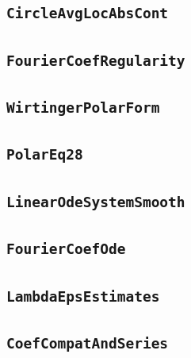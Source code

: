 \documentclass[11pt]{amsart}
\theoremstyle{definition}
\begin{document}
\subsection{\texorpdfstring{\texttt{CircleAvgLocAbsCont}}{CircleAvgLocAbsCont}}\label{node:CircleAvgLocAbsCont}


\subsection{\texorpdfstring{\texttt{FourierCoefRegularity}}{FourierCoefRegularity}}\label{node:FourierCoefRegularity}


\subsection{\texorpdfstring{\texttt{WirtingerPolarForm}}{WirtingerPolarForm}}\label{node:WirtingerPolarForm}


\subsection{\texorpdfstring{\texttt{PolarEq28}}{PolarEq28}}\label{node:PolarEq28}


\subsection{\texorpdfstring{\texttt{LinearOdeSystemSmooth}}{LinearOdeSystemSmooth}}\label{node:LinearOdeSystemSmooth}


\subsection{\texorpdfstring{\texttt{FourierCoefOde}}{FourierCoefOde}}\label{node:FourierCoefOde}


\subsection{\texorpdfstring{\texttt{LambdaEpsEstimates}}{LambdaEpsEstimates}}\label{node:LambdaEpsEstimates}


\subsection{\texorpdfstring{\texttt{CoefCompatAndSeries}}{CoefCompatAndSeries}}\label{node:CoefCompatAndSeries}

\end{document}
